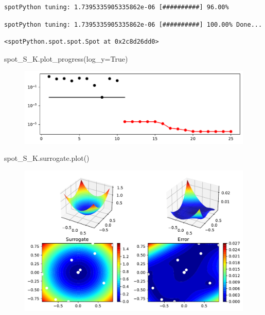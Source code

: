 \documentclass[
  letterpaper,
  DIV=11,
  numbers=noendperiod]{scrreprt}
\newenvironment{Shaded}{\begin{snugshade}}{\end{snugshade}}
\newcommand{\NormalTok}[1]{\textcolor[rgb]{0.00,0.23,0.31}{#1}}
\newcommand{\OperatorTok}[1]{\textcolor[rgb]{0.37,0.37,0.37}{#1}}
\newcommand{\VariableTok}[1]{\textcolor[rgb]{0.07,0.07,0.07}{#1}}
\begin{document}
\begin{verbatim}
spotPython tuning: 1.7395335905335862e-06 [##########] 96.00% 
\end{verbatim}

\begin{verbatim}
spotPython tuning: 1.7395335905335862e-06 [##########] 100.00% Done...
\end{verbatim}

\begin{verbatim}
<spotPython.spot.spot.Spot at 0x2c8d26dd0>
\end{verbatim}

\begin{Shaded}
\begin{Highlighting}[]
\NormalTok{spot\_S\_K.plot\_progress(log\_y}\OperatorTok{=}\VariableTok{True}\NormalTok{)}
\end{Highlighting}
\end{Shaded}

\begin{figure}[H]

{\centering \includegraphics{07_spot_ei_files/figure-pdf/cell-40-output-1.pdf}

}

\end{figure}

\begin{Shaded}
\begin{Highlighting}[]
\NormalTok{spot\_S\_K.surrogate.plot()}
\end{Highlighting}
\end{Shaded}

\begin{figure}[H]

{\centering \includegraphics{07_spot_ei_files/figure-pdf/cell-41-output-1.pdf}

}

\end{figure}
\end{document}
